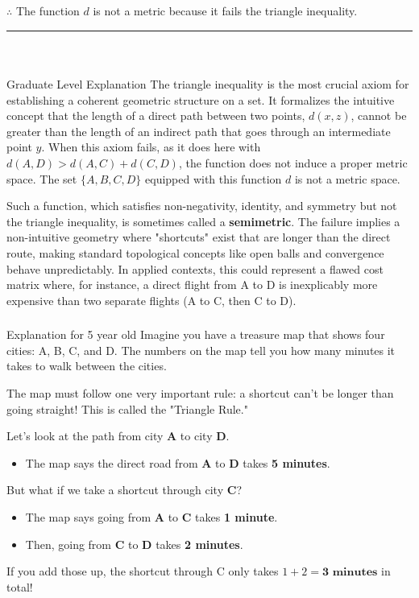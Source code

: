 \documentclass{article}
\begin{document}
\subsubsection*{\normalfont}{$\therefore$ The function $d$ is not a metric because it fails the triangle inequality.}

\noindent\rule{\textwidth}{0.4pt}\\

\newpage

\subsubsection*{\normalfont}{Graduate Level Explanation}
The triangle inequality is the most crucial axiom for establishing a coherent geometric structure on a set. It formalizes the intuitive concept that the length of a direct path between two points, $d(x, z)$, cannot be greater than the length of an indirect path that goes through an intermediate point $y$. When this axiom fails, as it does here with $d(A, D) > d(A, C) + d(C, D)$, the function does not induce a proper metric space. The set $\{A,B,C,D\}$ equipped with this function $d$ is not a metric space.

Such a function, which satisfies non-negativity, identity, and symmetry but not the triangle inequality, is sometimes called a \textbf{semimetric}. The failure implies a non-intuitive geometry where "shortcuts" exist that are longer than the direct route, making standard topological concepts like open balls and convergence behave unpredictably. In applied contexts, this could represent a flawed cost matrix where, for instance, a direct flight from A to D is inexplicably more expensive than two separate flights (A to C, then C to D).

\subsubsection*{\normalfont}{Explanation for 5 year old}
Imagine you have a treasure map that shows four cities: A, B, C, and D. The numbers on the map tell you how many minutes it takes to walk between the cities. 

The map must follow one very important rule: a shortcut can't be longer than going straight! This is called the "Triangle Rule."

Let's look at the path from city \textbf{A} to city \textbf{D}.
\begin{itemize}
    \item The map says the direct road from \textbf{A} to \textbf{D} takes \textbf{5 minutes}.
\end{itemize}
But what if we take a shortcut through city \textbf{C}?
\begin{itemize}
    \item The map says going from \textbf{A} to \textbf{C} takes \textbf{1 minute}.
    \item Then, going from \textbf{C} to \textbf{D} takes \textbf{2 minutes}.
\end{itemize}
If you add those up, the shortcut through C only takes $1 + 2 = \textbf{3 minutes}$ in total!
\end{document}
